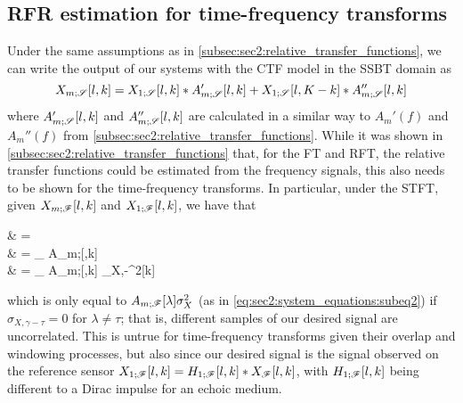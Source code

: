 \subsection{RFR estimation for time-frequency transforms}
\label{subsec:sec2:rfr_estimation_time-freq_transforms}
Under the same assumptions as in \cref{subsec:sec2:relative_transfer_functions}, we can write the output of our systems with the CTF model in the SSBT domain as
\begin{equation}
	\label{eq:sec2:system_ctf_ssbt_output}
	X_{m;\mathscr{S}}[l,k] = X_{1;\mathscr{S}}[l,k] \ast A_{m;\mathscr{S}}'[l,k] + X_{1;\mathscr{S}}[l,K-k] \ast A_{m;\mathscr{S}}''[l,k]
\end{equation}
where $A_{m;\mathscr{S}}'[l,k]$ and $A_{m;\mathscr{S}}''[l,k]$ are calculated in a similar way to $A_m'(f)$ and $A_m''(f)$ from \cref{subsec:sec2:relative_transfer_functions}. While it was shown in \cref{subsec:sec2:relative_transfer_functions} that, for the FT and RFT, the relative transfer functions could be estimated from the frequency signals, this also needs to be shown for the time-frequency transforms. In particular, under the STFT, given $X_{m;\mathscr{F}}[l,k]$ and $X_{1;\mathscr{F}}[l,k]$, we have that
\begin{equations}
	& =  \\
	& = \sum_{\tau} A_{m;\sF}[\tau,k]  \\
	& = \sum_{\tau} A_{m;\sF}[\tau,k] \sigma_{X,\lambda-\tau}^2[k]
\end{equations}
which is only equal to $A_{m;\mathscr{F}}[\lambda] \sigma_{X}^2$ (as in \cref{eq:sec2:system_equations:subeq2}) if $\sigma_{X,\gamma-\tau} = 0$ for $\lambda \neq \tau$; that is, different samples of our desired signal are uncorrelated. This is untrue for time-frequency transforms given their overlap and windowing processes, but also since our desired signal is the signal observed on the reference sensor $X_{1;\mathscr{F}}[l,k] = H_{1;\mathscr{F}}[l,k] \ast X_{\mathscr{F}}[l,k]$, with $H_{1;\mathscr{F}}[l,k]$ being different to a Dirac impulse for an echoic medium.

